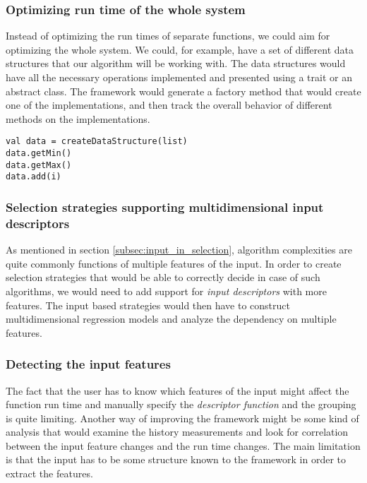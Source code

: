 \subsubsection{Optimizing run time of the whole system}

Instead of optimizing the run times of separate functions, we could aim for optimizing the whole system. We could, for example, have a set of different data structures that our algorithm will be working with. The data structures would have all the necessary operations implemented and presented using a trait or an abstract class. The framework would generate a factory method that would create one of the implementations, and then track the overall behavior of different methods on the implementations. 

\lstset{style=Scala}
\begin{lstlisting}
val data = createDataStructure(list)
data.getMin()
data.getMax()
data.add(i)
\end{lstlisting}

\subsubsection{Selection strategies supporting multidimensional input descriptors}

As mentioned in section \ref{subsec:input_in_selection}, algorithm complexities are quite commonly functions of multiple features of the input. In order to create selection strategies that would be able to correctly decide in case of such algorithms, we would need to add support for \textit{input descriptors} with more features. The input based strategies would then have to construct multidimensional regression models and analyze the dependency on multiple features.

\subsubsection{Detecting the input features}

The fact that the user has to know which features of the input might affect the function run time and manually specify the \textit{descriptor function} and the grouping is quite limiting. Another way of improving the framework might be some kind of analysis that would examine the history measurements and look for correlation between the input feature changes and the run time changes. The main limitation is that the input has to be some structure known to the framework in order to extract the features.


